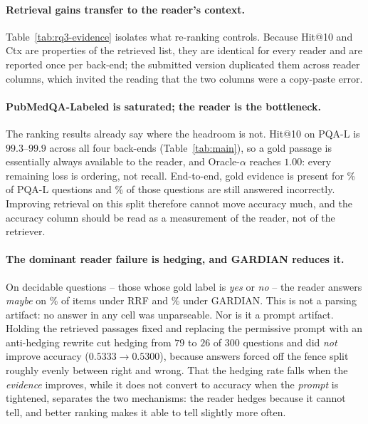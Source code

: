 \paragraph{Retrieval gains transfer to the reader's context.}
Table~\ref{tab:rq3-evidence} isolates what re-ranking controls. Because
Hit@10 and Ctx are properties of the retrieved list, they are identical
for every reader and are reported once per back-end; the submitted
version duplicated them across reader columns, which invited the reading
that the two columns were a copy-paste error. \PENDING

\paragraph{PubMedQA-Labeled is saturated; the reader is the bottleneck.}
The ranking results already say where the headroom is not. Hit@10 on
PQA-L is $99.3$--$99.9$ across all four back-ends (Table~\ref{tab:main}),
so a gold passage is essentially always available to the reader, and
Oracle-$\alpha$ reaches $1.00$: every remaining loss is ordering, not
recall. End-to-end, gold evidence is present for \PENDING\% of PQA-L
questions and \PENDING\% of those questions are still answered
incorrectly. Improving retrieval on this split therefore cannot move
accuracy much, and the accuracy column should be read as a measurement of
the reader, not of the retriever.

\paragraph{The dominant reader failure is hedging, and GARDIAN reduces it.}
On decidable questions -- those whose gold label is \emph{yes} or
\emph{no} -- the reader answers \emph{maybe} on \PENDING\% of items under
RRF and \PENDING\% under GARDIAN. This is not a parsing artifact: no
answer in any cell was unparseable. Nor is it a prompt artifact. Holding
the retrieved passages fixed and replacing the permissive prompt with an
anti-hedging rewrite cut hedging from $79$ to $26$ of $300$ questions and
did \emph{not} improve accuracy ($0.5333 \to 0.5300$), because answers
forced off the fence split roughly evenly between right and wrong. That
the hedging rate falls when the \emph{evidence} improves, while it does
not convert to accuracy when the \emph{prompt} is tightened, separates
the two mechanisms: the reader hedges because it cannot tell, and better
ranking makes it able to tell slightly more often.

